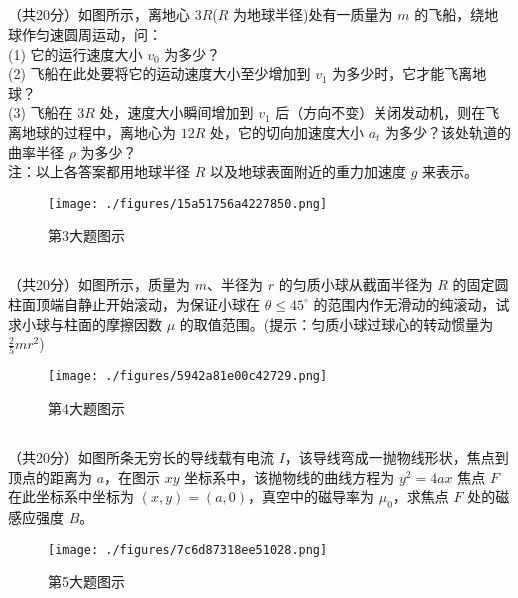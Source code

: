 \subsection{ }
（共20分）如图所示，离地心 $3R$($R$ 为地球半径)处有一质量为 $m$ 的飞船，绕地球作匀速圆周运动，问：\\
(1) 它的运行速度大小 $v_{0}$ 为多少？\\
(2) 飞船在此处要将它的运动速度大小至少增加到 $v_{1}$ 为多少时，它才能飞离地球？\\
(3) 飞船在 $3R$ 处，速度大小瞬间增加到 $v_{1}$ 后（方向不变）关闭发动机，则在飞离地球的过程中，离地心为 $12R$ 处，它的切向加速度大小 $a_{t}$ 为多少？该处轨道的曲率半径 $\rho$ 为多少？\\
注：以上各答案都用地球半径 $R$ 以及地球表面附近的重力加速度 $g$ 来表示。\\
\begin{figure}[ht]
\centering
\texttt{[image: ./figures/15a51756a4227850.png]}
\caption{第3大题图示} \label{fig_CAS20_1}
\end{figure}

\subsection{ }
（共20分）如图所示，质量为 $m$、半径为 $r$ 的匀质小球从截面半径为 $R$ 的固定圆柱面顶端自静止开始滚动，为保证小球在 $\theta \le 45^{\circ}$ 的范围内作无滑动的纯滚动，试求小球与柱面的摩擦因数 $\mu$ 的取值范围。(提示：匀质小球过球心的转动惯量为 $\frac{2}{5} mr^{2}$)\\
\begin{figure}[ht]
\centering
\texttt{[image: ./figures/5942a81e00c42729.png]}
\caption{第4大题图示} \label{fig_CAS20_2}
\end{figure}

\subsection{ }
（共20分）如图所条无穷长的导线载有电流 $I$，该导线弯成一抛物线形状，焦点到顶点的距离为 $a$，在图示 $xy$ 坐标系中，该抛物线的曲线方程为 $y^{2}=4ax$ 焦点 $F$ 在此坐标系中坐标为 $(x,y)=(a,0)$，真空中的磁导率为 $\mu_{0}$，求焦点 $F$ 处的磁感应强度 $B$。\\
\begin{figure}[ht]
\centering
\texttt{[image: ./figures/7c6d87318ee51028.png]}
\caption{第5大题图示} \label{fig_CAS20_3}
\end{figure}

